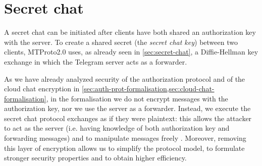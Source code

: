 \section{Secret chat}
A secret chat can be initiated after clients have both shared an authorization key with the server. To create a shared secret (the \textit{secret chat key}) between two clients, MTProto2.0 uses, as already seen in \cref{sec:secret-chat}, a Diffie-Hellman key exchange in which the Telegram server acts as a forwarder.

As we have already analyzed security of the authorization protocol and of the cloud chat encryption in \cref{sec:auth-prot-formalisation,sec:cloud-chat-formalisation}, in the formalisation we do not encrypt messages with the authorization key, nor we use the server as a forwarder. Instead, we execute the secret chat protocol exchanges as if they were plaintext: this allows the attacker to act as the server (i.e. having knowledge of both authorization key and forwarding messages) and to manipulate messages freely \cite{MTProto2-Proverif}. Moreover, removing this layer of encryption allows us to simplify the protocol model, to formulate stronger security properties and to obtain higher efficiency.

